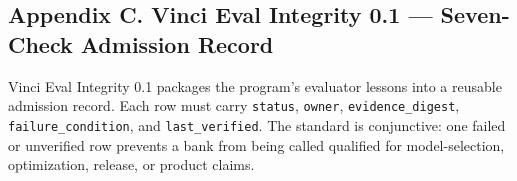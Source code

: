 \documentclass[
  9pt,
  letterpaper,
]{article}
\begin{document}
\hypertarget{appendix-c-vinci-eval-integrity-01--seven-check-admission-record}{%
\subsection{Appendix C. Vinci Eval Integrity 0.1 --- Seven-Check
Admission
Record}\label{appendix-c-vinci-eval-integrity-01--seven-check-admission-record}}

Vinci Eval Integrity 0.1 packages the program's evaluator lessons into a
reusable admission record. Each row must carry \texttt{status},
\texttt{owner}, \texttt{evidence\_digest}, \texttt{failure\_condition},
and \texttt{last\_verified}. The standard is conjunctive: one failed or
unverified row prevents a bank from being called qualified for
model-selection, optimization, release, or product claims.
\end{document}
